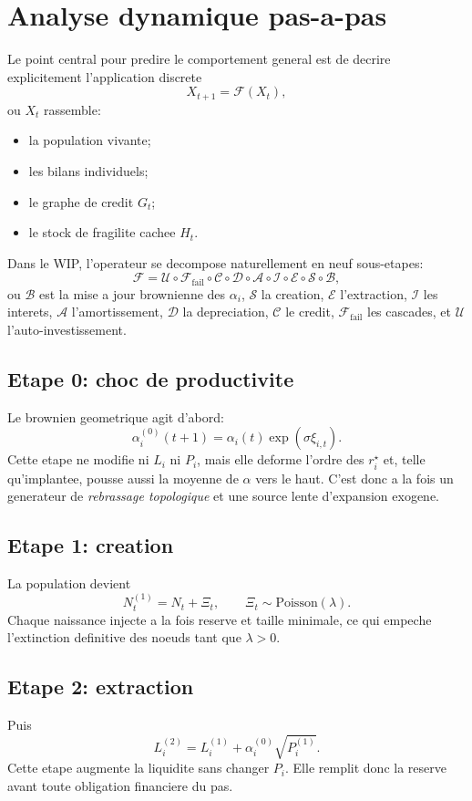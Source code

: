 \documentclass[11pt,a4paper]{article}
\begin{document}
\section{Analyse dynamique pas-a-pas}
Le point central pour predire le comportement general est de decrire explicitement l'application discrete
\[
X_{t+1}=\mathcal F(X_t),
\]
ou $X_t$ rassemble:
\begin{itemize}
\item la population vivante;
\item les bilans individuels;
\item le graphe de credit $G_t$;
\item le stock de fragilite cachee $H_t$.
\end{itemize}

Dans le WIP, l'operateur se decompose naturellement en neuf sous-etapes:
\[
\mathcal F=
\mathcal U \circ
\mathcal F_{\mathrm{fail}} \circ
\mathcal C \circ
\mathcal D \circ
\mathcal A \circ
\mathcal I \circ
\mathcal E \circ
\mathcal S \circ
\mathcal B,
\]
ou $\mathcal B$ est la mise a jour brownienne des $\alpha_i$, $\mathcal S$ la creation, $\mathcal E$ l'extraction, $\mathcal I$ les interets, $\mathcal A$ l'amortissement, $\mathcal D$ la depreciation, $\mathcal C$ le credit, $\mathcal F_{\mathrm{fail}}$ les cascades, et $\mathcal U$ l'auto-investissement.

\subsection{Etape 0: choc de productivite}
Le brownien geometrique agit d'abord:
\[
\alpha_i^{(0)}(t+1)=\alpha_i(t)\exp(\sigma \xi_{i,t}).
\]
Cette etape ne modifie ni $L_i$ ni $P_i$, mais elle deforme l'ordre des $r_i^\star$ et, telle qu'implantee, pousse aussi la moyenne de $\alpha$ vers le haut. C'est donc a la fois un generateur de \emph{rebrassage topologique} et une source lente d'expansion exogene.

\subsection{Etape 1: creation}
La population devient
\[
N_t^{(1)}=N_t+\Xi_t,
\qquad
\Xi_t\sim\mathrm{Poisson}(\lambda).
\]
Chaque naissance injecte a la fois reserve et taille minimale, ce qui empeche l'extinction definitive des noeuds tant que $\lambda>0$.

\subsection{Etape 2: extraction}
Puis
\[
L_i^{(2)} = L_i^{(1)} + \alpha_i^{(0)}\sqrt{P_i^{(1)}}.
\]
Cette etape augmente la liquidite sans changer $P_i$. Elle remplit donc la reserve avant toute obligation financiere du pas.
\end{document}
